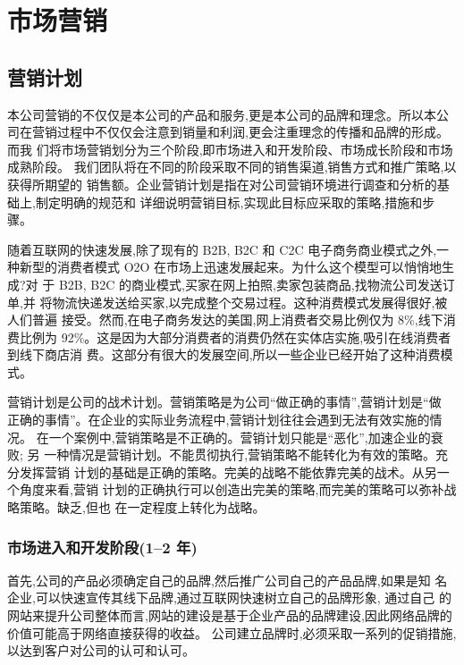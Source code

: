 \chapter{市场营销}

\section{营销计划}
本公司营销的不仅仅是本公司的产品和服务,更是本公司的品牌和理念。所以本公
司在营销过程中不仅仅会注意到销量和利润,更会注重理念的传播和品牌的形成。而我
们将市场营销划分为三个阶段,即市场进入和开发阶段、市场成长阶段和市场成熟阶段。
我们团队将在不同的阶段采取不同的销售渠道,销售方式和推广策略,以获得所期望的
销售额。企业营销计划是指在对公司营销环境进行调查和分析的基础上,制定明确的规范和
详细说明营销目标,实现此目标应采取的策略,措施和步骤。

随着互联网的快速发展,除了现有的 B2B, B2C 和 C2C 电子商务商业模式之外,一
种新型的消费者模式 O2O 在市场上迅速发展起来。为什么这个模型可以悄悄地生成?对
于 B2B, B2C 的商业模式,买家在网上拍照,卖家包装商品,找物流公司发送订单,并
将物流快递发送给买家,以完成整个交易过程。这种消费模式发展得很好,被人们普遍
接受。然而,在电子商务发达的美国,网上消费者交易比例仅为 8\%,线下消费比例为
92\%。这是因为大部分消费者的消费仍然在实体店实施,吸引在线消费者到线下商店消
费。这部分有很大的发展空间,所以一些企业已经开始了这种消费模式。

营销计划是公司的战术计划。营销策略是为公司“做正确的事情”,营销计划是“做
正确的事情”。在企业的实际业务流程中,营销计划往往会遇到无法有效实施的情况。
在一个案例中,营销策略是不正确的。营销计划只能是“恶化”,加速企业的衰败; 另
一种情况是营销计划。不能贯彻执行,营销策略不能转化为有效的策略。充分发挥营销
计划的基础是正确的策略。完美的战略不能依靠完美的战术。从另一个角度来看,营销
计划的正确执行可以创造出完美的策略,而完美的策略可以弥补战略策略。缺乏,但也
在一定程度上转化为战略。

\subsection{市场进入和开发阶段(1--2 年)}
首先,公司的产品必须确定自己的品牌,然后推广公司自己的产品品牌,如果是知
名企业,可以快速宣传其线下品牌,通过互联网快速树立自己的品牌形象, 通过自己
的网站来提升公司整体而言,网站的建设是基于企业产品的品牌建设,因此网络品牌的
价值可能高于网络直接获得的收益。 公司建立品牌时,必须采取一系列的促销措施,
以达到客户对公司的认可和认可。

